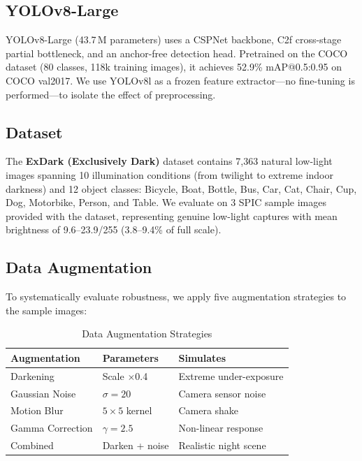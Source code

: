 \documentclass[conference]{IEEEtran}
\begin{document}
\subsection{YOLOv8-Large}

YOLOv8-Large (43.7\,M parameters) uses a CSPNet backbone, C2f
cross-stage partial bottleneck, and an anchor-free detection head.
Pretrained on the COCO dataset (80 classes, 118k training images), it
achieves 52.9\% mAP@0.5:0.95 on COCO val2017. We use YOLOv8l as a
frozen feature extractor---no fine-tuning is performed---to isolate the
effect of preprocessing.

\subsection{Dataset}

The \textbf{ExDark (Exclusively Dark)} dataset \cite{loh2019exdark}
contains 7,363 natural low-light images spanning 10 illumination
conditions (from twilight to extreme indoor darkness) and 12 object
classes: Bicycle, Boat, Bottle, Bus, Car, Cat, Chair, Cup, Dog,
Motorbike, Person, and Table. We evaluate on 3 SPIC sample images
provided with the dataset, representing genuine low-light captures with
mean brightness of 9.6--23.9/255 (3.8--9.4\% of full scale).

\subsection{Data Augmentation}

To systematically evaluate robustness, we apply five augmentation
strategies to the sample images:

\begin{table}[h]
\centering
\caption{Data Augmentation Strategies}
\label{tab:augmentations}
\begin{tabular}{lll}
\toprule
\textbf{Augmentation} & \textbf{Parameters} & \textbf{Simulates} \\
\midrule
Darkening        & Scale $\times$0.4      & Extreme under-exposure \\
Gaussian Noise   & $\sigma = 20$          & Camera sensor noise \\
Motion Blur      & $5{\times}5$ kernel    & Camera shake \\
Gamma Correction & $\gamma = 2.5$         & Non-linear response \\
Combined         & Darken + noise         & Realistic night scene \\
\bottomrule
\end{tabular}
\end{table}
\end{document}

